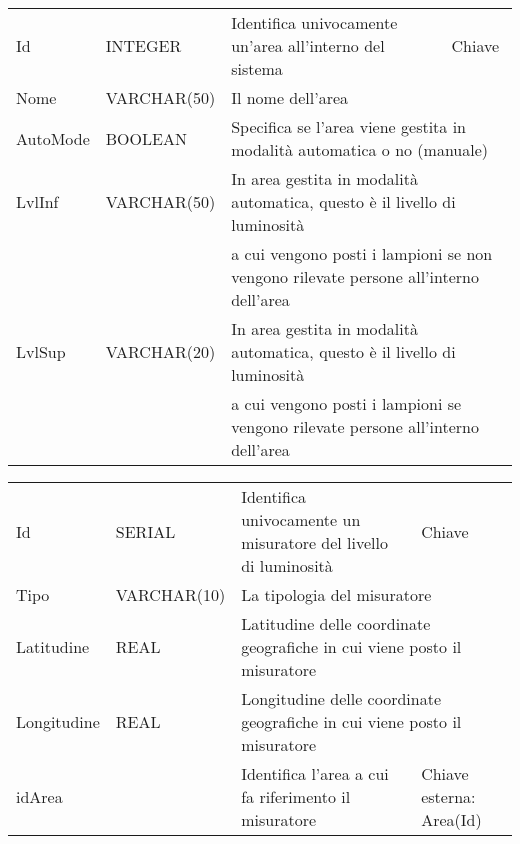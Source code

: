 \begin{center}
    \begin{tabularx}{\textwidth}{|l|l|l|X|}
        \hline
        \rowcolor{gray!30}
        \multicolumn{4}{|c|}{\textbf{AREA}}\\
        \hline
        Id & INTEGER & Identifica univocamente un'area all'interno del sistema & Chiave\\
        \hline
        Nome & VARCHAR(50) & \multicolumn{2}{l|}{Il nome dell'area} \\
        \hline
        AutoMode & BOOLEAN & \multicolumn{2}{l|}{Specifica se l'area viene gestita in modalità automatica o no (manuale)} \\
        \hline
        LvlInf & VARCHAR(50) & \multicolumn{2}{l|}{In area gestita in modalità automatica, questo è il livello di luminosità} \\ & & \multicolumn{2}{l|}{a cui vengono posti i lampioni se non vengono rilevate persone all'interno dell'area} \\
        \hline
        LvlSup & VARCHAR(20) & \multicolumn{2}{l|}{In area gestita in modalità automatica, questo è il livello di luminosità} \\ & & \multicolumn{2}{l|}{a cui vengono posti i lampioni se vengono rilevate persone all'interno dell'area} \\
        \hline
    \end{tabularx}
\end{center}

\begin{center}
    \begin{tabularx}{\textwidth}{|l|l|l|X|}
        \hline
        \rowcolor{gray!30}
        \multicolumn{4}{|c|}{\textbf{MISURATORE}}\\
        \hline
        Id & SERIAL & Identifica univocamente un misuratore del livello di luminosità & Chiave\\
        \hline
        Tipo & VARCHAR(10) & \multicolumn{2}{l|}{La tipologia del misuratore} \\
        \hline
        Latitudine & REAL & \multicolumn{2}{l|}{Latitudine delle coordinate geografiche in cui viene posto il misuratore} \\
        \hline
        Longitudine & REAL & \multicolumn{2}{l|}{Longitudine delle coordinate geografiche in cui viene posto il misuratore} \\
        \hline
        idArea & & Identifica l'area a cui fa riferimento il misuratore & Chiave esterna: Area(Id)\\
        \hline
    \end{tabularx}
\end{center}

